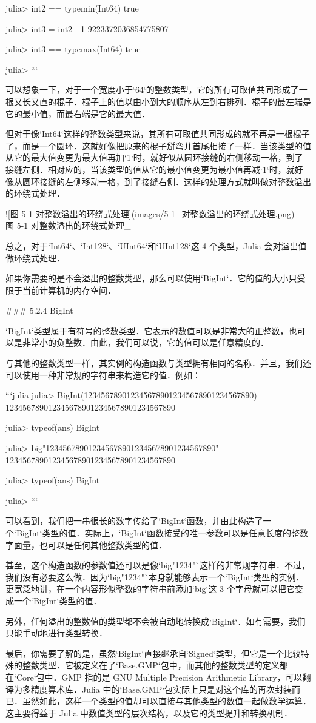 julia> int2 == typemin(Int64)
true

julia> int3 = int2 - 1
9223372036854775807

julia> int3 == typemax(Int64)
true

julia> 
```

可以想象一下，对于一个宽度小于`64`的整数类型，它的所有可取值共同形成了一根又长又直的棍子．棍子上的值以由小到大的顺序从左到右排列．棍子的最左端是它的最小值，而最右端是它的最大值．

但对于像`Int64`这样的整数类型来说，其所有可取值共同形成的就不再是一根棍子了，而是一个圆环．这就好像把原来的棍子掰弯并首尾相接了一样．当该类型的值从它的最大值变更为最大值再加`1`时，就好似从圆环接缝的右侧移动一格，到了接缝左侧．相对应的，当该类型的值从它的最小值变更为最小值再减`1`时，就好像从圆环接缝的左侧移动一格，到了接缝右侧．这样的处理方式就叫做对整数溢出的环绕式处理．

![图 5-1 对整数溢出的环绕式处理](images/5-1_对整数溢出的环绕式处理.png)
_图 5-1 对整数溢出的环绕式处理_

总之，对于`Int64`、`Int128`、`UInt64`和`UInt128`这 4 个类型，Julia 会对溢出值做环绕式处理．

如果你需要的是不会溢出的整数类型，那么可以使用`BigInt`．它的值的大小只受限于当前计算机的内存空间．

### 5.2.4 BigInt

`BigInt`类型属于有符号的整数类型．它表示的数值可以是非常大的正整数，也可以是非常小的负整数．由此，我们可以说，它的值可以是任意精度的．

与其他的整数类型一样，其实例的构造函数与类型拥有相同的名称．并且，我们还可以使用一种非常规的字符串来构造它的值．例如：

```julia
julia> BigInt(1234567890123456789012345678901234567890)
1234567890123456789012345678901234567890

julia> typeof(ans)
BigInt

julia> big"1234567890123456789012345678901234567890"
1234567890123456789012345678901234567890

julia> typeof(ans)
BigInt

julia>
```

可以看到，我们把一串很长的数字传给了`BigInt`函数，并由此构造了一个`BigInt`类型的值．实际上，`BigInt`函数接受的唯一参数可以是任意长度的整数字面量，也可以是任何其他整数类型的值．

甚至，这个构造函数的参数值还可以是像`big"1234"`这样的非常规字符串．不过，我们没有必要这么做．因为`big"1234"`本身就能够表示一个`BigInt`类型的实例．更宽泛地讲，在一个内容形似整数的字符串前添加`big`这 3 个字母就可以把它变成一个`BigInt`类型的值．

另外，任何溢出的整数值的类型都不会被自动地转换成`BigInt`．如有需要，我们只能手动地进行类型转换．

最后，你需要了解的是，虽然`BigInt`直接继承自`Signed`类型，但它是一个比较特殊的整数类型．它被定义在了`Base.GMP`包中，而其他的整数类型的定义都在`Core`包中．GMP 指的是 GNU Multiple Precision Arithmetic Library，可以翻译为多精度算术库．Julia 中的`Base.GMP`包实际上只是对这个库的再次封装而已．虽然如此，这样一个类型的值却可以直接与其他类型的数值一起做数学运算．这主要得益于 Julia 中数值类型的层次结构，以及它的类型提升和转换机制．